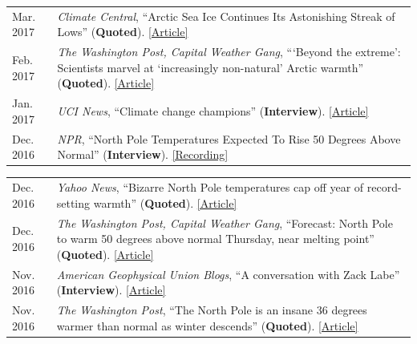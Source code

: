 \documentclass[margin,line,palatino,courier,10pt]{res}
\begin{document}
\begin{resume}
\begin{tabular}{@{}p{0.9in}p{4in}}
Mar. 2017 & \textit{Climate Central}, ``Arctic Sea Ice Continues Its Astonishing Streak of Lows'' (\textbf{Quoted}). \href{http://www.climatecentral.org/news/arctic-sea-ice-record-low-streak-21227}{[Article]}\\
Feb. 2017 & \textit{The Washington Post, Capital Weather Gang}, ```Beyond the extreme': Scientists marvel at `increasingly non-natural' Arctic warmth'' (\textbf{Quoted}). \href{https://www.washingtonpost.com/news/capital-weather-gang/wp/2017/02/01/beyond-the-extreme-scientists-marvel-at-increasingly-non-natural-arctic-warmth/?sdfsdfsdfsdfsd&utm_term=.cf3cf81d24f3}{[Article]}\\
Jan. 2017 & \textit{UCI News}, ``Climate change champions'' (\textbf{Interview}). \href{https://news.uci.edu/climate-change-champions/}{[Article]}\\
Dec. 2016 & \textit{NPR}, ``North Pole Temperatures Expected To Rise 50 Degrees Above Normal'' (\textbf{Interview}). \href{http://www.npr.org/2016/12/21/506483966/north-pole-temperatures-expected-to-rise-50-degrees-above-normal}{[Recording]}\\
\end{tabular}
\begin{tabular}{@{}p{0.9in}p{4in}}
Dec. 2016 & \textit{Yahoo News}, ``Bizarre North Pole temperatures cap off year of record-setting warmth'' (\textbf{Quoted}). \href{https://www.yahoo.com/news/bizarre-north-pole-temperatures-cap-off-year-of-record-setting-warmth-181727978.html?soc_src=social-sh&soc_trk=tw}{[Article]}\\
Dec. 2016 & \textit{The Washington Post, Capital Weather Gang}, ``Forecast: North Pole to warm 50 degrees above normal Thursday, near melting point'' (\textbf{Quoted}). \href{https://www.washingtonpost.com/news/capital-weather-gang/wp/2016/12/20/forecast-north-pole-to-warm-50-degrees-above-normal-thursday-near-melting-point/?dfgdfgdfgdfg&utm_term=.e648369ada7e}{[Article]}\\
Nov. 2016 & \textit{American Geophysical Union Blogs}, ``A conversation with Zack Labe'' (\textbf{Interview}). \href{http://blogs.agu.org/mountainbeltway/2016/11/23/conversation-zack-labe/}{[Article]}\\
Nov. 2016 & \textit{The Washington Post}, ``The North Pole is an insane 36 degrees warmer than normal as winter descends'' (\textbf{Quoted}). \href{https://www.washingtonpost.com/news/energy-environment/wp/2016/11/17/the-north-pole-is-an-insane-36-degrees-warmer-than-normal-as-winter-descends/?utm_term=.f2cb9596b3d8}{[Article]}\\

\end{tabular}
\end{resume}
\end{document}

